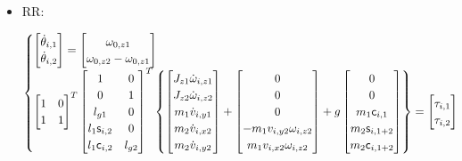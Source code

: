 \begin{itemize}
\item RR:

\begin{equation}
\begin{cases}

\begin{bmatrix}
\dot{\theta}_{i,1} \\
\dot{\theta}_{i,2} \\
\end{bmatrix}
=
\begin{bmatrix}
\omega_{0,z1} \\
\omega_{0,z2}-\omega_{0,z1} \\
\end{bmatrix} \\

\begin{bmatrix}
1 & 0 \\
1 & 1 \\
\end{bmatrix}^T
\begin{bmatrix}
 1 & 0 \\
 0 & 1 \\
 l_{g1} & 0 \\
 l_1 \mathsf{s}_{i,2} & 0 \\
 l_1 \mathsf{c}_{i,2} & l_{g2} \\
\end{bmatrix}^T
\begin{Bmatrix}
	\begin{bmatrix}
	J_{z1} \dot{\omega}_{i,z1} \\
	J_{z2} \dot{\omega}_{i,z2} \\
	m_1 \dot{v}_{i,y1} \\
	m_2 \dot{v}_{i,x2} \\
	m_2 \dot{v}_{i,y2} \\
	\end{bmatrix}
	+
	\begin{bmatrix}
	0 \\
	0 \\
	0 \\
	- m_1 v_{i,y2} \omega_{i,z2} \\
	  m_1 v_{i,x2} \omega_{i,z2} \\
	\end{bmatrix}
	+
	g \begin{bmatrix}
	0 \\
	0 \\
	m_1 \mathsf{c}_{i,1} \\
	m_2 \mathsf{s}_{i,1+2} \\
	m_2 \mathsf{c}_{i,1+2} \\
	\end{bmatrix}
\end{Bmatrix}
=
\begin{bmatrix}
\tau_{i,1} \\
\tau_{i,2}
\end{bmatrix} \\


\end{cases}
\end{equation}
\end{itemize}

